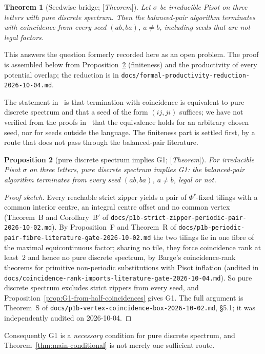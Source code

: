 \documentclass[11pt]{amsart}
\theoremstyle{plain}
\newtheorem{theorem}{Theorem}[section]
\newtheorem{proposition}[theorem]{Proposition}
\theoremstyle{definition}
\theoremstyle{remark}
\newcommand{\PDS}{pure discrete spectrum}
\newcommand{\Status}[1]{\textup{[\textit{#1}]}}
\begin{document}
\begin{theorem}[Seedwise bridge; \Status{Theorem}]\label{thm:seedwise}
Let $\sigma$ be irreducible Pisot on three letters with \PDS{}. Then the balanced-pair algorithm terminates with coincidence from \emph{every} seed $(ab,ba)$, $a\ne b$, including seeds that are not legal factors.
\end{theorem}
This answers the question formerly recorded here as an open problem. The proof is assembled below from Proposition~\ref{prop:PDS-implies-G1} (finiteness) and the productivity of every potential overlap; the reduction is in \texttt{docs/formal-productivity-reduction-2026-10-04.md}.


The statement in~\cite[Thm.~5.3]{ABBLS} is that termination with coincidence is equivalent to \PDS{} and that a seed of the form $(ij,ji)$ suffices; we have not verified from the proofs in~\cite{SS,HS} that the equivalence holds for an arbitrary chosen seed, nor for seeds outside the language. The finiteness part is settled first, by a route that does not pass through the balanced-pair literature.

\begin{proposition}[\PDS{} implies G1; \Status{Theorem}]\label{prop:PDS-implies-G1}
For irreducible Pisot $\sigma$ on three letters, \PDS{} implies G1: the balanced-pair algorithm terminates from every seed $(ab,ba)$, $a\ne b$, legal or not.
\end{proposition}
\begin{proof}[Proof sketch]
Every reachable strict zipper yields a pair of $\Phi^r$-fixed tilings with a common interior centre, an integral centre offset and no common vertex (Theorem~B and Corollary~B$'$ of \texttt{docs/p1b-strict-zipper-periodic-pair-2026-10-02.md}). By Proposition~F and Theorem~R of \texttt{docs/p1b-periodic-pair-fibre-literature-gate-2026-10-02.md} the two tilings lie in one fibre of the maximal equicontinuous factor; sharing no tile, they force coincidence rank at least~$2$ and hence no \PDS{}, by Barge's coincidence-rank theorems for primitive non-periodic substitutions with Pisot inflation (audited in \texttt{docs/coincidence-rank-imports-literature-gate-2026-10-04.md}). So \PDS{} excludes strict zippers from every seed, and Proposition~\ref{prop:G1-from-half-coincidences} gives G1. The full argument is Theorem~S of \texttt{docs/p1b-vertex-coincidence-box-2026-10-02.md}, \S5.1; it was independently audited on 2026-10-04.
\end{proof}

Consequently G1 is a \emph{necessary} condition for \PDS{}, and Theorem~\ref{thm:main-conditional} is not merely one sufficient route.
\end{document}
